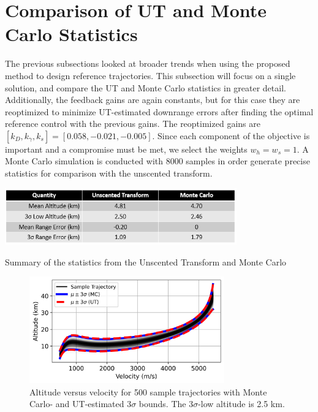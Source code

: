 \section{Comparison of UT and Monte Carlo Statistics}
The previous subsections looked at broader trends when using the proposed method to design reference trajectories. This subsection will focus on a single solution, and compare the UT and Monte Carlo statistics in greater detail. Additionally, the feedback gains are again constants, but for this case they are reoptimized to minimize UT-estimated downrange errors after finding the optimal reference control with the previous gains. The reoptimized gains are $[k_D, k_{\gamma}, k_s] = [0.058, -0.021, -0.005]$. Since each component of the objective is important and a compromise must be met, we select the weights $w_h=w_s=1$. A Monte Carlo simulation is conducted with 8000 samples in order generate precise statistics for comparison with the unscented transform. 
\begin{table}[h!]
	\centering
	\includegraphics[width=0.75\textwidth]{../PropellantOptimalJournal/ddp/table_mc}
	\caption{Summary of the statistics from the Unscented Transform and Monte Carlo}
	\label{table_mc}
\end{table}
\begin{figure}[h!]
	\centering
	\includegraphics[width=0.75\textwidth]{../PropellantOptimalJournal/ddp/python/Altitude}
	\caption{Altitude versus velocity for 500 sample trajectories with Monte Carlo- and UT-estimated 3$\sigma$ bounds. The 3$ \sigma $-low altitude is 2.5 km.}
	\label{fig_mc_alt}
\end{figure}
